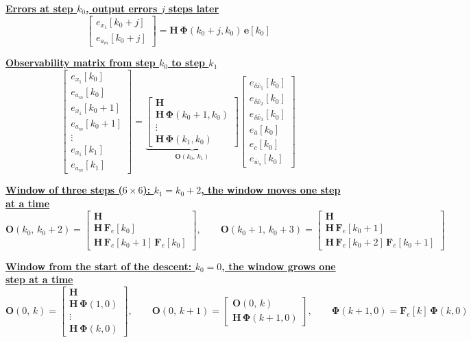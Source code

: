\documentclass[11pt,a4paper]{ctexart}
\newcommand{\bx}{\bar{x}}
\newcommand{\ba}{\bar{a}}
\newcommand{\bw}{\bar{w}}
\newcommand{\hd}[1]{\par\bigskip\noindent\underline{\textbf{#1}}}
\begin{document}
\hd{Errors at step $k_0$, output errors $j$ steps later}
\[
\begin{bmatrix} e_{x_1}[k_0+j] \\ e_{a_m}[k_0+j] \end{bmatrix}
= \mathbf{H}\,\bm{\Phi}(k_0+j,k_0)\,\mathbf{e}[k_0]
\]

\hd{Observability matrix from step $k_0$ to step $k_1$}
\[
\begin{bmatrix}
e_{x_1}[k_0] \\ e_{a_m}[k_0] \\[0.4ex]
e_{x_1}[k_0+1] \\ e_{a_m}[k_0+1] \\[0.4ex]
\vdots \\[0.4ex]
e_{x_1}[k_1] \\ e_{a_m}[k_1]
\end{bmatrix}
=
\underbrace{\begin{bmatrix}
\mathbf{H} \\[0.4ex]
\mathbf{H}\,\bm{\Phi}(k_0+1,k_0) \\[0.4ex]
\vdots \\[0.4ex]
\mathbf{H}\,\bm{\Phi}(k_1,k_0)
\end{bmatrix}}_{\mathbf{O}(k_0,\,k_1)}
\begin{bmatrix} e_{\delta\bx_1}[k_0] \\ e_{\delta\bx_2}[k_0] \\ e_{\delta\bx_3}[k_0] \\ e_{\ba}[k_0] \\ e_c[k_0] \\ e_{\bw_s}[k_0] \end{bmatrix}
\]

\hd{Window of three steps ($6 \times 6$): $k_1 = k_0 + 2$, the window moves one step at a time}
\[
\mathbf{O}(k_0,\,k_0+2) =
\begin{bmatrix}
\mathbf{H} \\[0.4ex]
\mathbf{H}\,\mathbf{F}_e[k_0] \\[0.4ex]
\mathbf{H}\,\mathbf{F}_e[k_0+1]\,\mathbf{F}_e[k_0]
\end{bmatrix},
\qquad
\mathbf{O}(k_0+1,\,k_0+3) =
\begin{bmatrix}
\mathbf{H} \\[0.4ex]
\mathbf{H}\,\mathbf{F}_e[k_0+1] \\[0.4ex]
\mathbf{H}\,\mathbf{F}_e[k_0+2]\,\mathbf{F}_e[k_0+1]
\end{bmatrix}
\]

\hd{Window from the start of the descent: $k_0 = 0$, the window grows one step at a time}
\[
\mathbf{O}(0,\,k) =
\begin{bmatrix}
\mathbf{H} \\[0.4ex]
\mathbf{H}\,\bm{\Phi}(1,0) \\[0.4ex]
\vdots \\[0.4ex]
\mathbf{H}\,\bm{\Phi}(k,0)
\end{bmatrix},
\qquad
\mathbf{O}(0,\,k+1) =
\begin{bmatrix}
\mathbf{O}(0,\,k) \\[0.4ex]
\mathbf{H}\,\bm{\Phi}(k+1,0)
\end{bmatrix},
\qquad
\bm{\Phi}(k+1,0) = \mathbf{F}_e[k]\,\bm{\Phi}(k,0)
\]
\end{document}
